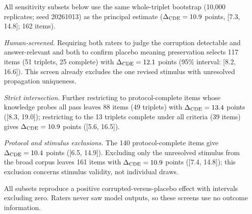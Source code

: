 All sensitivity subsets below use the same whole-triplet bootstrap (10,000 replicates; seed 20261013) as the principal estimate ($\Delta_{\mathrm{CDE}}=10.9$ points, [7.3, 14.8]; 162 items).

\emph{Human-screened.} Requiring both raters to judge the corruption detectable and answer-relevant and both to confirm placebo meaning preservation selects 117 items (51 triplets, 25 complete) with $\Delta_{\mathrm{CDE}}=12.1$ points (95\% interval: [8.2, 16.6]). This screen already excludes the one revised stimulus with unresolved propagation uniqueness.

\emph{Strict intersection.} Further restricting to protocol-complete items whose knowledge probes all pass leaves 88 items (49 triplets) with $\Delta_{\mathrm{CDE}}=13.4$ points ([8.3, 19.0]); restricting to the 13 triplets complete under all criteria (39 items) gives $\Delta_{\mathrm{CDE}}=10.9$ points ([5.6, 16.5]).

\emph{Protocol and stimulus exclusions.} The 140 protocol-complete items give $\Delta_{\mathrm{CDE}}=10.4$ points ([6.5, 14.9]). Excluding only the unresolved stimulus from the broad corpus leaves 161 items with $\Delta_{\mathrm{CDE}}=10.9$ points ([7.4, 14.8]); this exclusion concerns stimulus validity, not individual draws.

All subsets reproduce a positive corrupted-versus-placebo effect with intervals excluding zero. Raters never saw model outputs, so these screens use no outcome information.
